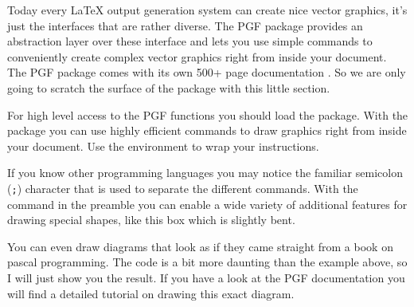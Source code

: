 Today every \LaTeX{} output generation system can create nice vector graphics,
it's just the interfaces that are rather diverse. The PGF package provides an
abstraction layer over these interface and lets you use simple commands to
conveniently create complex vector graphics right from inside your document. The
PGF package comes with its own 500+ page documentation
\cite{pgfplot}. So we are only going to scratch the surface of the package with this little
section.

For high level access to 
the PGF functions you should load the  package.
With the  package you can use highly efficient commands to
draw graphics right from inside your document. Use the 
environment to wrap your instructions.
\begin{example}
\end{example}
If you know other programming languages you
may notice the familiar semicolon (\texttt{;}) character that is used
to separate the different commands. With the 
command in the preamble you can enable a wide variety of additional
features for drawing special shapes, like this box which is slightly bent.
\begin{example}
\usetikzlibrary{%
  decorations.pathmorphing}
\end{example}

You can even draw diagrams that look as if they came straight from a book on
pascal programming. The code is a bit more daunting than the example above,
so I will just show you the result. If you have a look at the PGF documentation
you will find a detailed tutorial on drawing this exact diagram.

